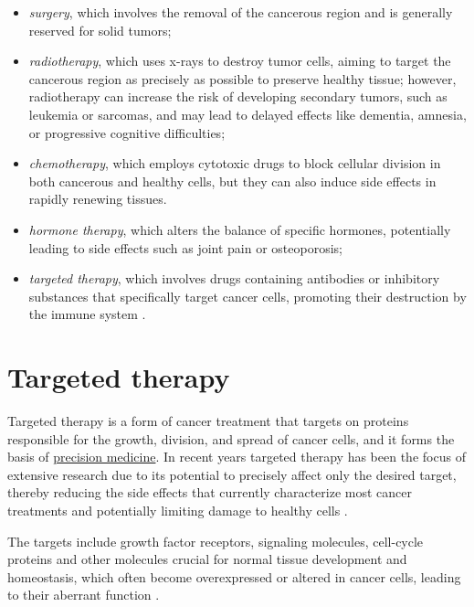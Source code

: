 \begin{itemize}
    \item \textit{surgery}, which involves the removal of the cancerous region and is generally reserved for solid tumors;
    \item \textit{radiotherapy}, which uses x-rays to destroy tumor cells, aiming to target the cancerous region as precisely as possible to preserve healthy tissue; however, radiotherapy can increase the risk of developing secondary tumors, such as leukemia or sarcomas, and may lead to delayed effects like dementia, amnesia, or progressive cognitive difficulties;
    \item \textit{chemotherapy}, which employs cytotoxic drugs to block cellular division in both cancerous and healthy cells, but they can also induce side effects in rapidly renewing tissues.
    \item \textit{hormone therapy}, which alters the balance of specific hormones, potentially leading to side effects such as joint pain or osteoporosis;
    \item \textit{targeted therapy}, which involves drugs containing antibodies or inhibitory substances that specifically target cancer cells, promoting their destruction by the immune system \cite{target_therapy1} .
\end{itemize}

\section{Targeted therapy}

Targeted therapy is a form of cancer treatment that targets on proteins responsible for the growth, division, and spread of cancer cells, and it forms the basis of \href{https://en.wikipedia.org/wiki/Personalized_medicine}{precision medicine}. In recent years targeted therapy has been the focus of extensive research due to its potential to precisely affect only the desired target, thereby reducing the side effects that currently characterize most cancer treatments and potentially limiting damage to healthy cells \cite{target_therapy1}.

The targets include growth factor receptors, signaling molecules, cell-cycle proteins and other molecules crucial for normal tissue development and homeostasis, which often become overexpressed or altered in cancer cells, leading to their aberrant function \cite{se_tt}.

